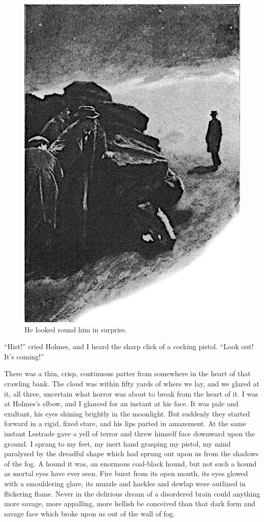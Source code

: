 \documentclass[paper=5.5in:8.5in,BCOR=7mm,twoside,DIV=calc,12pt,usegeometry,openany,chapterprefix,endperiod]{scrbook} %
\begin{document}
\begin{figure}[tbph]
\centering
\includegraphics[width=.8\linewidth]{14_lookedround}
\caption{He looked round him in surprise.}
\end{figure}

\enquote{Hist!} cried Holmes, and I heard the sharp click of a cocking pistol. \enquote{Look out! It's coming!}

There was a thin, crisp, continuous patter from somewhere in the heart of that crawling bank. The cloud was within fifty yards of where we lay, and we glared at it, all three, uncertain what horror was about to break from the heart of it. I was at Holmes's elbow, and I glanced for an instant at his face. It was pale and exultant, his eyes shining brightly in the moonlight. But suddenly they started forward in a rigid, fixed stare, and his lips parted in amazement. At the same instant Lestrade gave a yell of terror and threw himself face downward upon the ground. I sprang to my feet, my inert hand grasping my pistol, my mind paralyzed by the dreadful shape which had sprung out upon us from the shadows of the fog. A hound it was, an enormous coal-black hound, but not such a hound as mortal eyes have ever seen. Fire burst from its open mouth, its eyes glowed with a smouldering glare, its muzzle and hackles and dewlap were outlined in flickering flame. Never in the delirious dream of a disordered brain could anything more savage, more appalling, more hellish be conceived than that dark form and savage face which broke upon us out of the wall of fog.
\end{document}
